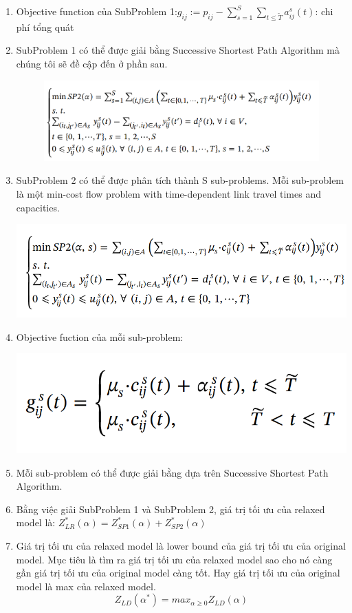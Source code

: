 \documentclass[a4paper]{article}
\begin{document}
\begin{enumerate}
    \item[] Objective function của SubProblem 1:$g_{ij}:= p_{ij} - \sum_{s=1}^S\sum_{t \leq \widetilde T} a_{ij}^s(t)$: chi phí tổng quát
    \item[] SubProblem 1 có thể được giải bằng Successive Shortest Path Algorithm mà chúng tôi sẽ đề cập đến ở phần sau. 
    \begin{figure}[h]
        \centering
        \includegraphics[width=0.6\linewidth]{image5.png} 
    \end{figure}
    \item[] SubProblem 2 có thể được phân tích thành S sub-problems. Mỗi sub-problem là một min-cost flow problem with time-dependent link travel times and capacities.
    \begin{center}
        \includegraphics[width=0.5\linewidth]{image6.png}      
    \end{center}
    \item[] Objective fuction của mỗi sub-problem: 
    \begin{center}
        \includegraphics[width=0.35\linewidth]{image7.png}    
    \end{center}
    \item[] Mỗi sub-problem có thể được giải bằng dựa trên Successive Shortest Path Algorithm.
    \item[] Bằng việc giải SubProblem 1 và SubProblem 2, giá trị tối ưu của relaxed model là: $Z_{LR}^*(\alpha) =  Z_{SP1}^*(\alpha)+ Z_{SP2}^*(\alpha)$
    \item[] Giá trị tối ưu của relaxed model là lower bound của giá trị tối ưu của original model. Mục tiêu là tìm ra giá trị tối ưu của relaxed model sao cho nó càng gần giá trị tối ưu của original model càng tốt. Hay giá trị tối ưu của original model là max của relaxed model.
    \[Z_{LD}(\alpha^*) = max_{\alpha \geq 0} Z_{LD}(\alpha)\]
\end{enumerate}
\end{document}
